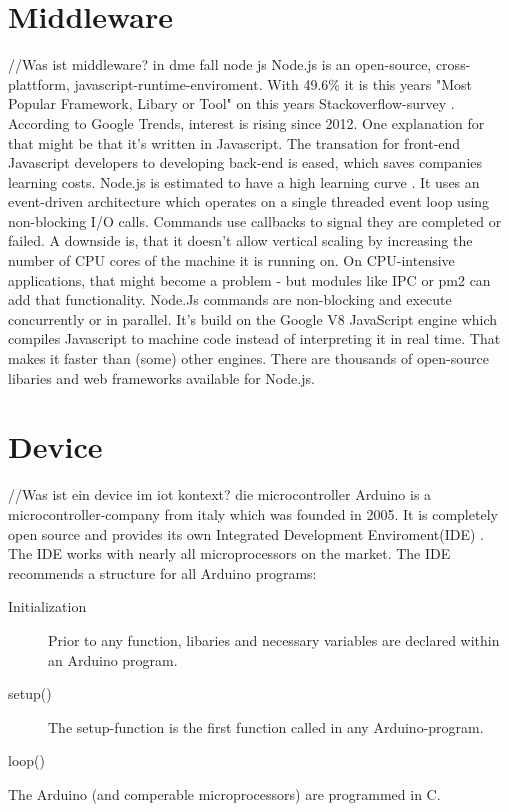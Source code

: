 \section{Middleware}
//Was ist middleware? in dme fall node js
Node.js is an open-source, cross-plattform, javascript-runtime-enviroment. 
With 49.6\% it is this years "Most Popular Framework, Libary or Tool" on this years Stackoverflow-survey \parencite{stackOverflowSurvey}.
According to Google Trends, interest is rising since 2012\parencite{gogleTrendNode}.
One explanation for that might be that it's written in Javascript. 
The transation for front-end Javascript developers to developing back-end is eased, which saves companies learning costs.
Node.js is estimated to have a high learning curve \parencite{nodeLearningcurve}.
It uses an event-driven architecture which operates on a single threaded event loop using non-blocking I/O calls.
Commands use callbacks to signal they are completed or failed. 
A downside is, that it doesn't allow vertical scaling by increasing the number of CPU cores of the machine it is running on. 
On CPU-intensive applications, that might become a problem - but modules like IPC or pm2 can add that functionality.
Node.Js commands are non-blocking and execute concurrently or in parallel. 
It's build on the Google V8 JavaScript engine which compiles Javascript to machine code instead of interpreting it in real time. 
That makes it faster than (some) other engines.
There are thousands of open-source libaries and web frameworks available for Node.js. 
\section{Device}
//Was ist ein device im iot kontext? die microcontroller 
Arduino is a microcontroller-company from italy which was founded in 2005. 
It is completely open source and provides its own Integrated Development Enviroment(IDE) \parencite{arduinoIDEDownload}.
The IDE works with nearly all microprocessors on the market. 
The IDE recommends a structure for all Arduino programs:
\begin{description}
    \item [Initialization]
    Prior to any function, libaries and necessary variables are declared within an Arduino program.
    \item [setup()]
    The setup-function is the first function called in any Arduino-program.
    \item [loop()]
\end{description}
The Arduino (and comperable microprocessors) are programmed in C.
